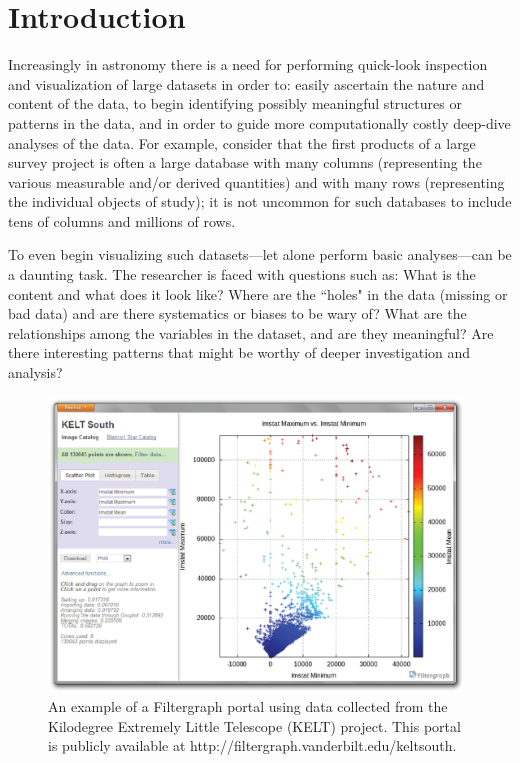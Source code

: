 \section{Introduction}
Increasingly in astronomy there is a need for performing quick-look inspection and visualization of large datasets in order to: easily ascertain the nature and content of the data, to begin identifying possibly meaningful structures or patterns in the data, and in order to guide more computationally costly deep-dive analyses of the data. For example, consider that the first products of a large survey project is often a large database with many columns (representing the various measurable and/or derived quantities) and with many rows (representing the individual objects of study); it is not uncommon for such databases to include tens of columns and millions of rows.

To even begin visualizing such datasets---let alone perform basic analyses---can be a daunting task. The researcher is faced with questions such as: What is the content and what does it look like? Where are the ``holes" in the data (missing or bad data) and are there systematics or biases to be wary of? What are the relationships among the variables in the dataset, and are they meaningful? Are there interesting patterns that might be worthy of deeper investigation and analysis?

\begin{figure}
\centering
\includegraphics[width=110mm]{part11/Burger_F2/F2_f1.eps}
\caption{An example of a Filtergraph portal using data collected from the Kilodegree Extremely Little Telescope (KELT) project. This portal is publicly available at http://filtergraph.vanderbilt.edu/keltsouth.}
\end{figure}


